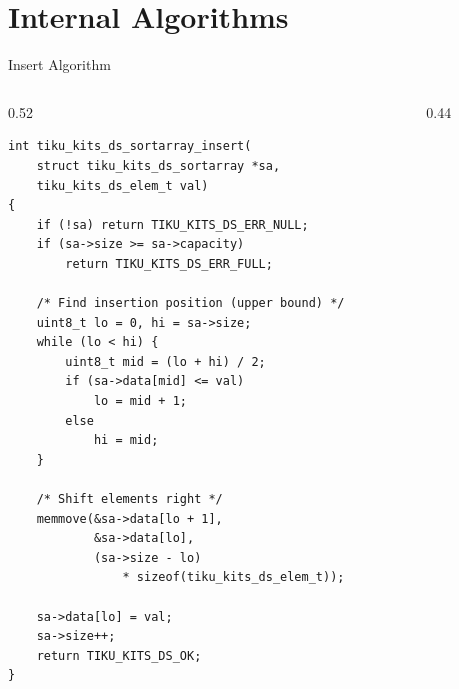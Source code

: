 \documentclass[aspectratio=169, 10pt]{beamer}
\begin{document}
\section{Internal Algorithms}

\begin{frame}[fragile]{Insert Algorithm}
\begin{columns}[T]
\begin{column}{0.52\textwidth}
\begin{lstlisting}[style=cstyle,
  title={Insert: binary search + shift right}]
int tiku_kits_ds_sortarray_insert(
    struct tiku_kits_ds_sortarray *sa,
    tiku_kits_ds_elem_t val)
{
    if (!sa) return TIKU_KITS_DS_ERR_NULL;
    if (sa->size >= sa->capacity)
        return TIKU_KITS_DS_ERR_FULL;

    /* Find insertion position (upper bound) */
    uint8_t lo = 0, hi = sa->size;
    while (lo < hi) {
        uint8_t mid = (lo + hi) / 2;
        if (sa->data[mid] <= val)
            lo = mid + 1;
        else
            hi = mid;
    }

    /* Shift elements right */
    memmove(&sa->data[lo + 1],
            &sa->data[lo],
            (sa->size - lo)
                * sizeof(tiku_kits_ds_elem_t));

    sa->data[lo] = val;
    sa->size++;
    return TIKU_KITS_DS_OK;
}
\end{lstlisting}
\end{column}

\begin{column}{0.44\textwidth}
\begin{center}
\end{center}
\end{column}
\end{columns}
\end{frame}
\end{document}
